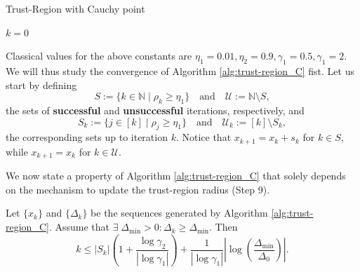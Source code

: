\documentclass[10pt,a4paper]{article}
\begin{document}
\begin{algorithm}[H]\label{alg:trust-region_C}
	\caption{Trust-Region with Cauchy point}
	
	
	$k = 0$
	
	\While{$||\grad(x_k)||>\epsilon$}{
		
		Compute a step $s_k$ that satisfies \eqref{eq:cauchy_point}. 
		
		Compute $\rho_k:= \frac{f(x_k)-f(x_k+s_k)}{m_k(0)-m_k(s_k)}$
		
		\If{$\rho_k\geq \eta_1$}{$x_{k+1} = x_k +s_k$}
		
		\Else{$x_{k+1} = x_k$}
		
		$\Delta_{k+1} = \begin{cases}
			\gamma_2 \Delta_k \quad &\text{if } \rho_k\geq \eta_2\\
			\Delta_k \quad &\text{if } \rho_k\in [\eta_1, \eta_2)\\
			\gamma_1 \Delta_k \quad &\text{if } \rho_k<\eta_1\\
		\end{cases}$
		
		$k = k+1$
	}
\end{algorithm}
\noindent Classical values for the above constants are $\eta_1=0.01, \eta_2=0.9, \gamma_1=0.5, \gamma_1=2$. We will thus study the convergence of Algorithm \ref{alg:trust-region_C} fist. Let us start by defining 
\begin{equation*}
	S := \{k \in \mathbb{N} \mid \rho_k \geq \eta_1\} \quad \text{and} \quad \mathcal{U}:= \mathbb{N} \setminus S,
\end{equation*}
the sets of \textbf{successful} and \textbf{unsuccessful} iterations, respectively, and
\begin{equation*}
	S_k := \{j \in [k] \mid \rho_j \geq \eta_1\} \quad \text{and} \quad \mathcal{U}_k := [k] \setminus S_k,
\end{equation*}
the corresponding sets up to iteration $k$. Notice that $x_{k+1} = x_k + s_k$ for $k \in S$, while $x_{k+1} = x_k$ for $k \in \mathcal{U}$.

We now state a property of Algorithm \ref{alg:trust-region_C} that solely depends on the mechanism to update the trust-region radius (Step 9).

\begin{lemma}
	Let $\{x_k\}$ and $\{\Delta_k\}$ be the sequences generated by Algorithm \ref{alg:trust-region_C}. Assume that $\exists \; \Delta_{\min} > 0: \Delta_k \geq \Delta_{\min}$. Then
	\begin{equation*}
		k \leq |S_k| \left( 1 + \frac{\log \gamma_2}{|\log \gamma_1|} \right) + \frac{1}{|\log \gamma_1|} \left| \log \left( \frac{\Delta_{\min}}{\Delta_0} \right) \right|.
	\end{equation*}
\end{lemma}
\end{document}
